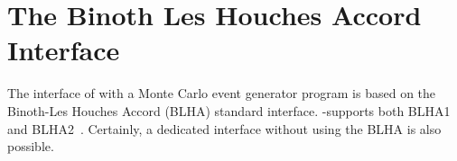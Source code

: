%

\chapter{The Binoth Les Houches Accord Interface}
\label{sec:blha}


The interface of \gosam{} with a Monte Carlo event generator program 
is based on the Binoth-Les Houches Accord (BLHA)
standard interface.
\gosam{}-\gosamversion supports both BLHA1~\cite{Binoth:2010xt}
and BLHA2~\cite{Alioli:2013nda}.
Certainly, a dedicated interface without using the BLHA is also possible.



